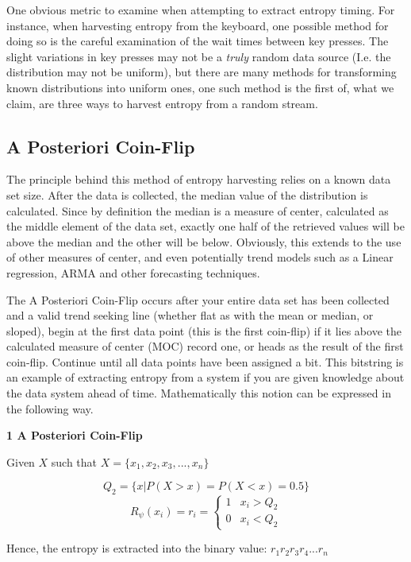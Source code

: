 \documentclass{IEEEtran}
\newenvironment{definition}[1][Definition]{\begin{trivlist}
\item[\hskip \labelsep {\bfseries #1}]}{\end{trivlist}}
\begin{document}
One obvious metric to examine when attempting to extract entropy timing. For instance, when harvesting entropy from the keyboard, one possible method for doing so is the careful examination of the wait times between key presses. The slight variations in key presses may not be a \textit{truly} random data source (I.e. the distribution may not be uniform), but there are many methods for transforming known distributions into uniform ones, one such method is the first of, what we claim, are three ways to harvest entropy from a random stream. 

\subsection{A Posteriori Coin-Flip}

The principle behind this method of entropy harvesting relies on a known data set size. After the data is collected, the median value of the distribution is calculated. Since by definition the median is a measure of center, calculated as the middle element of the data set, exactly one half of the retrieved values will be above the median and the other will be below. Obviously, this extends to the use of other measures of center, and even potentially trend models such as a Linear regression, ARMA and other forecasting techniques. 

The A Posteriori Coin-Flip occurs after your entire data set has been collected and a valid trend seeking line (whether flat as with the mean or median, or sloped), begin at the first data point (this is the first coin-flip) if it lies above the calculated measure of center (MOC) record one, or heads as the result of the first coin-flip. Continue until all data points have been assigned a bit. This bitstring is an example of extracting entropy from a system if you are given knowledge about the data system ahead of time. Mathematically this notion can be expressed in the following way. 

\begin{definition} \textbf{1 A Posteriori Coin-Flip} \\
\begin{center}
Given $X$ such that $X=\{x_1,x_2,x_3,...,x_n\}$ \\
\end{center}
$$Q_2 = \{x|P(X>x)=P(X<x)=0.5\}$$
$$R_\psi(x_i) = r_i = \begin{cases} 
      1 & x_i > Q_2 \\
      0 & x_i < Q_2
   \end{cases}$$
\begin{center}
Hence, the entropy is extracted into the binary value: $r_1r_2r_3r_4...r_n$
\end{center}
\end{definition}
\end{document}
